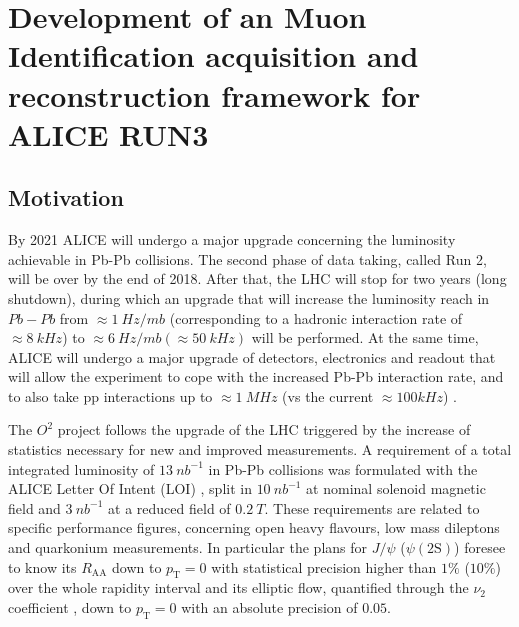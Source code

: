 \chapter{Development of an Muon Identification acquisition and reconstruction framework for ALICE RUN3}

\section{Motivation}
By 2021 ALICE will undergo a major upgrade concerning the luminosity achievable in Pb-Pb collisions.
The second phase of data taking, called Run 2, will be over by the end of 2018. 
After that, the LHC will stop for two years (long shutdown), during which an upgrade that will increase the luminosity reach in $Pb-Pb$ from $\approx 1\ Hz/mb$ (corresponding to a hadronic interaction rate of $\approx8\ kHz$) to $\approx6\ Hz/mb (\approx50\ kHz)$ will be performed.
At the same time, ALICE will undergo a major upgrade of detectors, electronics and readout that will allow the experiment to cope with the increased Pb-Pb interaction rate, and to also take pp interactions up to $\approx1\ MHz$ (vs the current $\approx100 kHz$) \cite{Abelev:1625842, CERN-LHCC-2013-020, CERN-LHCC-2015-001, Antonioli:1603472, Buncic:2011297}.

The $O^2$ project follows the upgrade of the LHC triggered by the increase of statistics necessary for new and improved measurements.
A requirement of a total integrated luminosity of $13\ nb^{-1}$ in Pb-Pb collisions was formulated with the ALICE Letter Of Intent (LOI) \cite{ALICE_LOI}, split in $10\ nb^{-1}$ at nominal solenoid magnetic field and $3\ nb^{-1}$ at a reduced field of $0.2\ T$.
These requirements are related to specific performance figures, concerning open heavy flavours, low mass dileptons and quarkonium measurements.
In particular the plans for $J/\psi$ ($\psi(\mathrm{2S})$) foresee to know its $R_{\mathrm{AA}}$ down to $p_{\mathrm{T}} = 0$ with statistical precision higher than $1\%$ ($10\%$) over the whole rapidity interval and its elliptic flow, quantified through the $\nu_2$ coefficient \cite{Acharya:2017tgv}, down to $p_{\mathrm{T}} = 0$ with an absolute precision of $0.05$.

